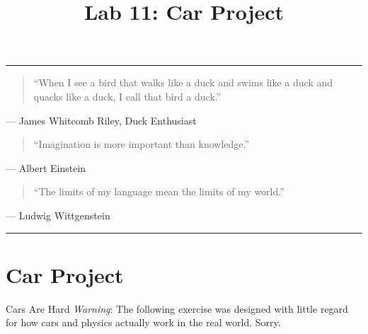\documentclass[11pt]{cselabheader}
\title{Lab 11: Car Project}
\begin{document}
\maketitle

\hrule

\begin{quotation}
  ``When I see a bird that walks like a duck and swims like a duck and quacks like
  a duck, I call that bird a duck.''
\end{quotation}
\begin{flushright}
  --- James Whitcomb Riley, Duck Enthusiast
\end{flushright}



\begin{quotation}
``Imagination is more important than knowledge.''
\end{quotation}
\begin{flushright}
  --- Albert Einstein
\end{flushright}

\begin{quotation}
``The limits of my language mean the limits of my world.''
\end{quotation}
\begin{flushright}
  --- Ludwig Wittgenstein
\end{flushright}

\hrule


\section{Car Project}

\begin{warningbox}{Cars Are Hard}
  \emph{Warning}: The following exercise was designed with little regard for
  how cars and physics actually work in the real world. Sorry.
\end{warningbox}
\end{document}
